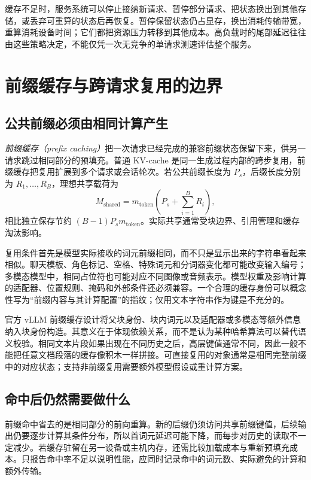 \documentclass[UTF8,12pt,a4paper,fontset=fandol]{ctexart}
\begin{document}
缓存不足时，服务系统可以停止接纳新请求、暂停部分请求、把状态换出到其他存储，或丢弃可重算的状态后再恢复。暂停保留状态仍占显存，换出消耗传输带宽，重算消耗设备时间；它们都把资源压力转移到其他成本。高负载时的尾部延迟往往由这些策略决定，不能仅凭一次无竞争的单请求测速评估整个服务。

\section{前缀缓存与跨请求复用的边界}
\label{sec:kv-prefix-sharing}

\subsection{公共前缀必须由相同计算产生}

\emph{前缀缓存（prefix caching）}把一次请求已经完成的兼容前缀状态保留下来，供另一请求跳过相同部分的预填充。普通 KV-cache 是同一生成过程内部的跨步复用，前缀缓存把复用扩展到多个请求或会话轮次。若公共前缀长度为 $P_s$，后缀长度分别为 $R_1,\ldots,R_B$，理想共享载荷为
\begin{equation}
 M_{\mathrm{shared}}=m_{\mathrm{token}}
 \left(P_s+\sum_{i=1}^{B}R_i\right),
 \label{eq:kv-prefix-memory}
\end{equation}
相比独立保存节约 $(B-1)P_sm_{\mathrm{token}}$。实际共享通常受块边界、引用管理和缓存淘汰影响。

复用条件首先是模型实际接收的词元前缀相同，而不只是显示出来的字符串看起来相似。聊天模板、角色标记、空格、特殊词元和分词器变化都可能改变输入编号；多模态模型中，相同占位符也可能对应不同图像或音频表示。模型权重及影响计算的适配器、位置规则、掩码和外部条件还必须兼容。一个合理的缓存身份可以概念性写为“前缀内容与其计算配置”的指纹；仅用文本字符串作为键是不充分的。

官方 vLLM 前缀缓存设计将父块身份、块内词元以及适配器或多模态等额外信息纳入块身份构造\cite{vllm-prefix}。其意义在于体现依赖关系，而不是认为某种哈希算法可以替代语义校验。相同文本片段如果出现在不同历史之后，高层键值通常不同，因此一般不能把任意文档段落的缓存像积木一样拼接。可直接复用的对象通常是相同完整前缀中的对应状态；支持非前缀复用需要额外模型假设或重计算方案。

\subsection{命中后仍然需要做什么}

前缀命中省去的是相同部分的前向重算。新的后缀仍须访问共享前缀键值，后续输出仍要逐步计算其条件分布，所以首词元延迟可能下降，而每步对历史的读取不一定减少。若缓存驻留在另一设备或主机内存，还需比较加载成本与重新预填充成本。只报告命中率不足以说明性能，应同时记录命中的词元数、实际避免的计算和额外传输。
\end{document}
